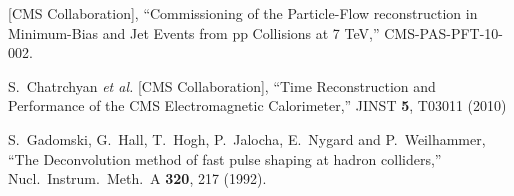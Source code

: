 \documentclass[journal]{IEEEtran}
\begin{document}
\begin{thebibliography}{1}
  [CMS Collaboration], ``Commissioning of the Particle-Flow reconstruction in Minimum-Bias and Jet Events from pp Collisions at 7 TeV,''  CMS-PAS-PFT-10-002.

  S.~Chatrchyan {\it et al.}  [CMS Collaboration], ``Time Reconstruction and Performance of the CMS Electromagnetic Calorimeter,''  JINST {\bf 5}, T03011 (2010)

  S.~Gadomski, G.~Hall, T.~Hogh, P.~Jalocha, E.~Nygard and P.~Weilhammer, ``The Deconvolution method of fast pulse shaping at hadron colliders,''  Nucl.\ Instrum.\ Meth.\ A {\bf 320}, 217 (1992).

\end{thebibliography}


\end{document}
